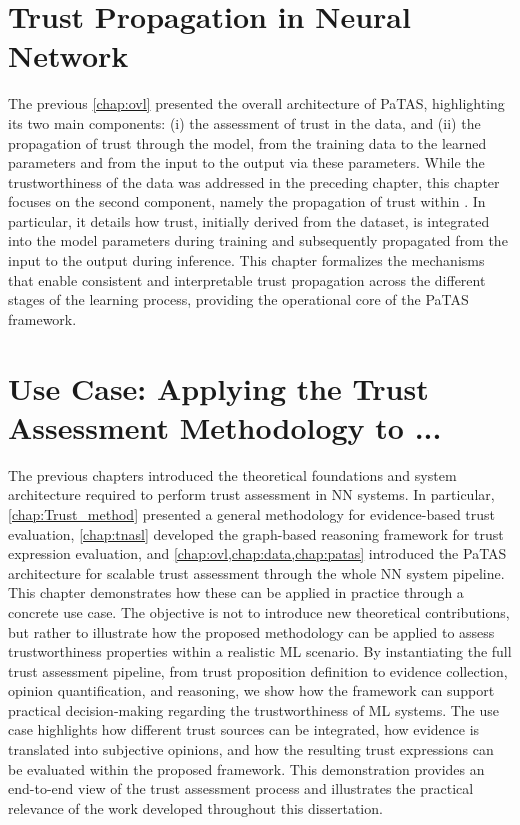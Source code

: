 \chapter{Trust Propagation in Neural Network}
The previous \cref{chap:ovl} presented the overall architecture of \ac{PaTAS}, highlighting its two main components: (i) the assessment of trust in the data, and (ii) the propagation of trust through the model, from the training data to the learned parameters and from the input to the output via these parameters. While the trustworthiness of the data was addressed in the preceding chapter, this chapter focuses on the second component, namely the propagation of trust within . In particular, it details how trust, initially derived from the dataset, is integrated into the model parameters during training and subsequently propagated from the input to the output during inference. This chapter formalizes the mechanisms that enable consistent and interpretable trust propagation across the different stages of the learning process, providing the operational core of the \ac{PaTAS} framework.

\chapter{Use Case: Applying the Trust Assessment Methodology to ...}
\noindent
The previous chapters introduced the theoretical foundations and system architecture required to perform trust assessment in \ac{NN} systems. In particular, \cref{chap:Trust_method} presented a general methodology for evidence-based trust evaluation, \cref{chap:tnasl} developed the graph-based reasoning framework for trust expression evaluation, and \cref{chap:ovl,chap:data,chap:patas} introduced the \ac{PaTAS} architecture for scalable trust assessment through the whole \ac{NN} system pipeline. This chapter demonstrates how these can be applied in practice through a concrete use case. The objective is not to introduce new theoretical contributions, but rather to illustrate how the proposed methodology can be applied to assess trustworthiness properties within a realistic \ac{ML} scenario. By instantiating the full trust assessment pipeline, from trust proposition definition to evidence collection, opinion quantification, and reasoning, we show how the framework can support practical decision-making regarding the
trustworthiness of \ac{ML} systems. The use case highlights how different trust sources can be integrated, how evidence is translated into subjective opinions, and how the resulting trust expressions can be evaluated within the proposed framework. This demonstration provides an end-to-end view of the trust assessment process and illustrates the practical relevance of the work developed throughout this dissertation.

